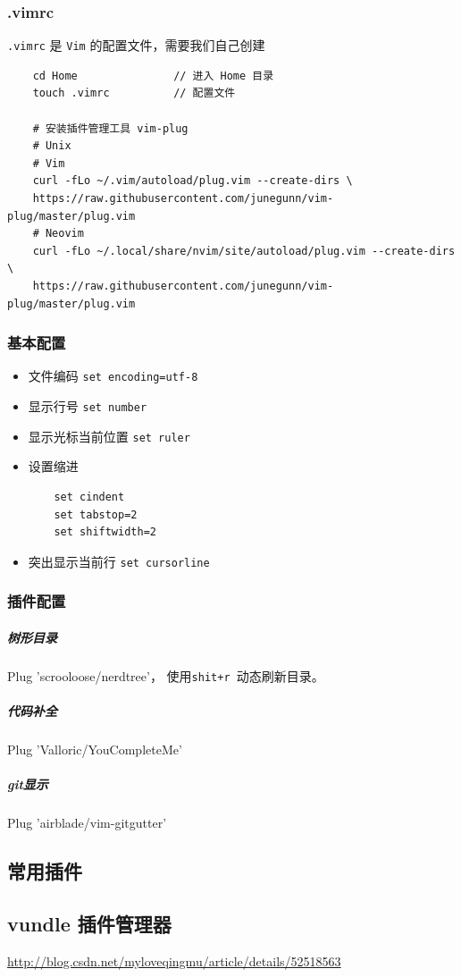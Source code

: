 \documentclass[UTF8,a4paper,12pt]{ctexbook}
\begin{document}
			\subsubsection{.vimrc}
				\verb|.vimrc| 是 \verb|Vim| 的配置文件，需要我们自己创建
				\begin{lstlisting}
	cd Home               // 进入 Home 目录
	touch .vimrc          // 配置文件
	
	# 安装插件管理工具 vim-plug
	# Unix
	# Vim
	curl -fLo ~/.vim/autoload/plug.vim --create-dirs \
	https://raw.githubusercontent.com/junegunn/vim-plug/master/plug.vim
	# Neovim
	curl -fLo ~/.local/share/nvim/site/autoload/plug.vim --create-dirs \
	https://raw.githubusercontent.com/junegunn/vim-plug/master/plug.vim
				\end{lstlisting}
			
			\subsubsection{基本配置}
				\begin{itemize}
					\item 文件编码 \verb|set encoding=utf-8|
					\item 显示行号 \verb|set number|
					\item 显示光标当前位置 \verb|set ruler|
					\item 设置缩进 
					    \begin{lstlisting}
	set cindent	
	set tabstop=2
	set shiftwidth=2
					    \end{lstlisting}
				    
					\item  突出显示当前行 \verb|set cursorline|
				\end{itemize}
				
			\subsubsection{插件配置}
				\subparagraph{树形目录}Plug 'scrooloose/nerdtree'， 使用\verb|shit+r |动态刷新目录。
				\subparagraph{代码补全}Plug 'Valloric/YouCompleteMe'
				\subparagraph{git显示}Plug 'airblade/vim-gitgutter'
							
		\subsection{常用插件}
			\subsection{vundle 插件管理器}
				\url{http://blog.csdn.net/myloveqingmu/article/details/52518563}
			
\end{document}
